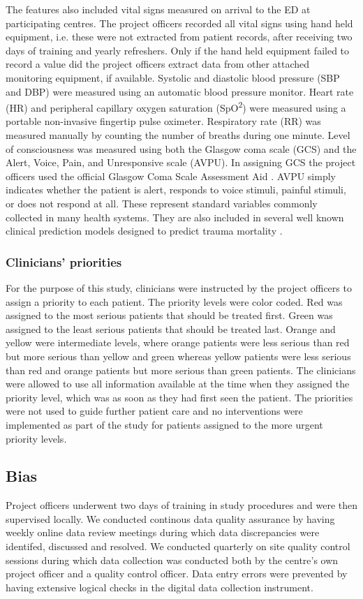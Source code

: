 \documentclass[10pt,letterpaper]{article}\usepackage[]{graphicx}\usepackage[]{color}
\begin{document}
The features also included vital signs measured on arrival to the ED at
participating centres. The project officers recorded all vital signs using hand
held equipment, i.e. these were not extracted from patient records, after
receiving two days of training and yearly refreshers. Only if the hand held
equipment failed to record a value did the project officers extract data from
other attached monitoring equipment, if available. Systolic and diastolic blood
pressure (SBP and DBP) were measured using an automatic blood pressure
monitor. Heart rate (HR) and peripheral capillary oxygen saturation
(SpO\textsuperscript{2}) were measured using a portable non-invasive fingertip
pulse oximeter. Respiratory rate (RR) was measured manually by counting the
number of breaths during one minute. Level of consciousness was measured using
both the Glasgow coma scale (GCS) and the Alert, Voice, Pain, and Unresponsive
scale (AVPU). In assigning GCS the project officers used the official Glasgow
Coma Scale Assessment Aid \cite{GCSAID}. AVPU simply indicates whether the
patient is alert, responds to voice stimuli, painful stimuli, or does not
respond at all. These represent standard variables commonly collected in many
health systems. They are also included in several well known clinical prediction
models designed to predict trauma mortality \cite{Rehn2011}.

\subsubsection*{Clinicians' priorities}
For the purpose of this study, clinicians were instructed by the project
officers to assign a priority to each patient. The priority levels were color
coded. Red was assigned to the most serious patients that should be treated
first. Green was assigned to the least serious patients that should be treated
last. Orange and yellow were intermediate levels, where orange patients were
less serious than red but more serious than yellow and green whereas yellow
patients were less serious than red and orange patients but more serious than
green patients. The clinicians were allowed to use all information available at
the time when they assigned the priority level, which was as soon as they had first
seen the patient. The priorities were not used to guide further patient care and
no interventions were implemented as part of the study for patients assigned to
the more urgent priority levels.

\subsection*{Bias}
Project officers underwent two days of training in study procedures and were
then supervised locally. We conducted continous data quality assurance by having
weekly online data review meetings during which data discrepancies were
identifed, discussed and resolved. We conducted quarterly on site quality
control sessions during which data collection was conducted both by the centre's
own project officer and a quality control officer. Data entry errors were
prevented by having extensive logical checks in the digital data collection
instrument.
\end{document}
